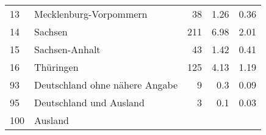 \begin{longtable}{lXrrr}
     13 &
     \multicolumn{1}{X}{ Mecklenburg-Vorpommern   } &


       \num{38} &
       \num[round-mode=places,round-precision=2]{1,26} &
         \num[round-mode=places,round-precision=2]{0,36} \\

     14 &
     \multicolumn{1}{X}{ Sachsen   } &


       \num{211} &
       \num[round-mode=places,round-precision=2]{6,98} &
         \num[round-mode=places,round-precision=2]{2,01} \\

     15 &
     \multicolumn{1}{X}{ Sachsen-Anhalt   } &


       \num{43} &
       \num[round-mode=places,round-precision=2]{1,42} &
         \num[round-mode=places,round-precision=2]{0,41} \\

     16 &
     \multicolumn{1}{X}{ Thüringen   } &


       \num{125} &
       \num[round-mode=places,round-precision=2]{4,13} &
         \num[round-mode=places,round-precision=2]{1,19} \\

     93 &
     \multicolumn{1}{X}{ Deutschland ohne nähere Angabe   } &


       \num{9} &
       \num[round-mode=places,round-precision=2]{0,3} &
         \num[round-mode=places,round-precision=2]{0,09} \\

     95 &
     \multicolumn{1}{X}{ Deutschland und Ausland   } &


       \num{3} &
       \num[round-mode=places,round-precision=2]{0,1} &
         \num[round-mode=places,round-precision=2]{0,03} \\

     100 &
     \multicolumn{1}{X}{ Ausland   } &



\end{longtable}
